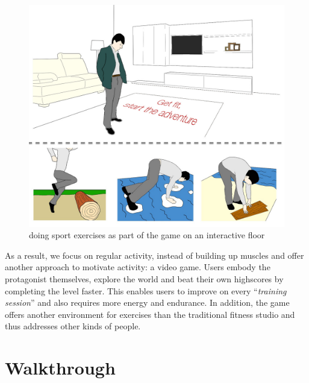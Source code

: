 \documentclass{sigchi}
\begin{document}
  \begin{figure}[!t]
    \centering
    \includegraphics[width=\columnwidth]{roto_main_2}
    \caption{doing sport exercises as part of the game on an interactive floor}
    \label{fig:figure1}
  \end{figure}

    As a result, we focus on regular activity, instead of building up muscles and offer another approach to motivate activity: a video game. Users embody the protagonist themselves, explore the world and beat their own highscores by completing the level faster. This enables users to improve on every ``\emph{training session}'' and also requires more energy and endurance. In addition, the game offers another environment for exercises than the traditional fitness studio and thus addresses other kinds of people.


\section{Walkthrough}
\end{document}
